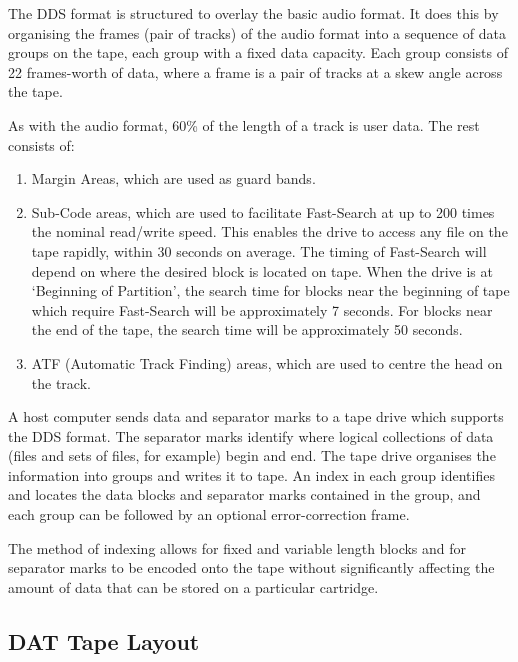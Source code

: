 The DDS format is structured to overlay the basic audio format. It does this
by organising the frames (pair of tracks) of the audio format into a
sequence of data groups on the tape, each group with a fixed data capacity.
Each group consists of 22 frames-worth of data, where a frame is a pair of
tracks at a skew angle across the tape.

As with the audio format, 60\% of the length of a track is user data. The
rest consists of:

\begin {enumerate}

\item Margin Areas, which are used as guard bands.

\item Sub-Code areas, which are used to facilitate Fast-Search at up to 200
times the nominal read/write speed. This enables the drive to access any
file on the tape rapidly, within 30 seconds on average. The timing of
Fast-Search will depend on where the desired block is located on tape.
When the drive is at `Beginning of Partition', the search time for blocks
near the beginning of tape which require Fast-Search will be approximately
7 seconds. For blocks near the end of the tape, the search time will be
approximately 50 seconds.

\item ATF (Automatic Track Finding) areas, which are used to centre the head
on the track.

\end {enumerate}

A host computer sends data and separator marks to a tape drive which
supports the DDS format. The separator marks identify where logical
collections of data (files and sets of files, for example) begin and end.
The tape drive organises the information into groups and writes it to tape.
An index in each group identifies and locates the data blocks and separator
marks contained in the group, and each group can be followed by an optional
error-correction frame.

The method of indexing allows for fixed and variable length blocks and for
separator marks to be encoded onto the tape without significantly affecting
the amount of data that can be stored on a particular cartridge.

\subsection {DAT Tape Layout}


